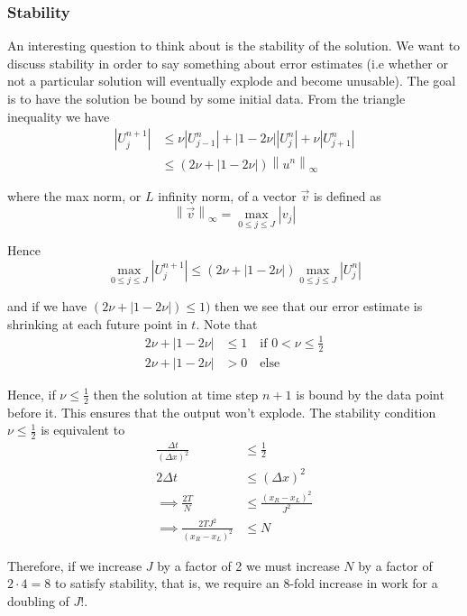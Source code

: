 \documentclass[12pt]{article}
\newcommand\norm[1]{\left\lVert#1\right\rVert} %
\newlength\tindent
\renewcommand{\indent}{\hspace*{\tindent}}
\begin{document}
\subsubsection{Stability}

\indent An interesting question to think about is the stability of the solution. We want to discuss stability in order to say something about error estimates (i.e whether or not a particular solution will eventually explode and become unusable). The goal is to have the solution be bound by some initial data. From the triangle inequality we have
\begin{align*}
	|U^{n + 1}_j| &\leq \nu |U^n_{j - 1}| + |1 - 2\nu||U^n_j| + \nu|U^n_{j + 1}| \\
	&\leq (2\nu + |1 - 2\nu|) \norm{u^n}_\infty
\end{align*}

where the max norm, or $L$ infinity norm, of a vector $\vec{v}$ is defined as
\begin{equation*}
	\norm{\vec{v}}_\infty = \max_{0 \leq j \leq J} |v_j|
\end{equation*}

Hence
\begin{equation*}
	\max_{0 \leq j \leq J} |U^{n + 1}_j| \leq (2\nu + |1 - 2\nu|) \max_{0 \leq j \leq J} |U^{n}_j|
\end{equation*}

and if we have $(2\nu + |1 - 2\nu|) \leq 1)$ then we see that our error estimate is shrinking at each future point in $t$. Note that
\begin{align*}
	2\nu + |1 - 2\nu| &\leq 1 \quad \text{if } 0 < \nu \leq \frac{1}{2} \\
	2\nu + |1 - 2\nu| &> 0 \quad \text{else}
\end{align*}

\indent Hence, if $\nu \leq \frac{1}{2}$ then the solution at time step $n + 1$ is bound by the data point before it. This ensures that the output won't explode. The stability condition $\nu \leq \frac{1}{2}$ is equivalent to
\begin{align*}
	\frac{ \Delta t }{ (\Delta x)^2 } &\leq \frac{1}{2} \\
	2\Delta t &\leq (\Delta x)^2 \\
	\implies \frac{2 T}{N} &\leq \frac{ (x_R - x_L)^2 }{J^2} \\
	\implies \frac{2TJ^2}{(x_R - x_L)^2} &\leq N
\end{align*}

\indent Therefore, if we increase $J$ by a factor of 2 we must increase $N$ by a factor of $2\cdot 4 = 8$ to satisfy stability, that is, we require an 8-fold increase in work for a doubling of $J$!.
\end{document}
